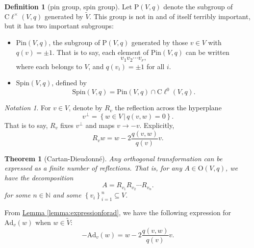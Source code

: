 \documentclass[a4paper,10pt]{scrreprt}
\newcommand{\N}{\mathbb{N}}
\newcommand{\defn}[1]{\ul{#1}}
\newcommand{\cliff}{\mathrm{C}\ell}
\newcommand{\Ad}{\mathrm{Ad}}
\newcommand{\Pin}{\mathrm{Pin}}
\newcommand{\Spin}{\mathrm{Spin}}
\newcommand{\Or}{\mathrm{O}}
\theoremstyle{definition}
\newtheorem{definition}{Definition}[section]
\theoremstyle{plain}
\newtheorem{theorem}{Theorem}[section]
\theoremstyle{remark}
\newtheorem{notation}{Notation}[section]
\begin{document}
\begin{definition}[pin group, spin group]
  \label{def:pinspingroup}
  Let $\mathrm{P}(V, q)$ denote the subgroup of $\cliff^{\times}(V, q)$ generated by $\tilde{V}$. This group is not in and of itself terribly important, but it has two important subgroups:
  \begin{itemize}
    \item \defn{$\Pin(V, q)$}, the subgroup of $\mathrm{P}(V, q)$ generated by those $v \in V$ with $q(v) = \pm 1$. That is to say, each element of $\Pin(V, q)$ can be written
      \begin{equation*}
        v_{1}v_{2}\cdots v_{r},
      \end{equation*}
      where each belongs to $V$, and $q(v_{i}) = \pm 1$ for all $i$.

    \item \defn{$\Spin(V, q)$}, defined by 
      \begin{equation*}
        \Spin(V, q) = \Pin(V, q) \cap \cliff^{0}(V, q).
      \end{equation*}
  \end{itemize}
\end{definition}

\begin{notation}
  For $v \in V$, denote by $R_{v}$ the reflection across the hyperplane 
  \begin{equation*}
    v^{\perp} = \left\{ w \in V\,\big|\, q(v, w) = 0 \right\}.
  \end{equation*}
  That is to say, $R_{v}$ fixes $v^{\perp}$ and maps $v \to -v$. Explicitly, 
  \begin{equation*}
    R_{v} w = w - 2\frac{q(v, w)}{q(v)} v.
  \end{equation*}
\end{notation}

\begin{theorem}[Cartan-Dieudonn{\'e}]
  \label{thm:cartandieudonne}
  Any orthogonal transformation can be expressed as a finite number of reflections. That is, for any $A \in \Or(V, q)$, we have the decomposition
  \begin{equation*}
    A = R_{v_{1}} R_{v_{2}} \cdots R_{v_{n}}.
  \end{equation*}
  for some $n \in \N$ and some $\left\{ v_{i} \right\}_{i=1}^{n} \subseteq V$.
\end{theorem}

From \hyperref[lemma:expressionforad]{Lemma \ref*{lemma:expressionforad}}, we have the following expression for $\Ad_{v}(w)$ when $w \in \tilde{V}$:
\begin{equation*}
  -\Ad_{v}(w) = w - 2\frac{q(v, w)}{q(v)}v.
\end{equation*}
\end{document}
